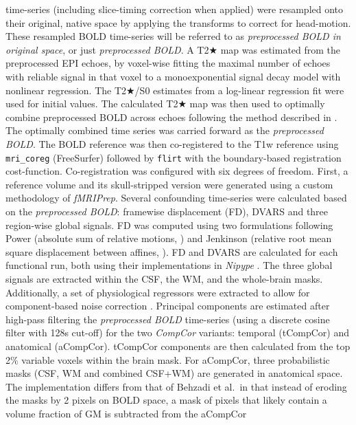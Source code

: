 \documentclass[
]{article}
\begin{document}
\begin{description}
time-series (including slice-timing correction when applied) were
resampled onto their original, native space by applying the transforms
to correct for head-motion. These resampled BOLD time-series will be
referred to as \emph{preprocessed BOLD in original space}, or just
\emph{preprocessed BOLD}. A T2★ map was estimated from the preprocessed
EPI echoes, by voxel-wise fitting the maximal number of echoes with
reliable signal in that voxel to a monoexponential signal decay model
with nonlinear regression. The T2★/S0 estimates from a log-linear
regression fit were used for initial values. The calculated T2★ map was
then used to optimally combine preprocessed BOLD across echoes following
the method described in \citep{posse_t2s}. The optimally combined time
series was carried forward as the \emph{preprocessed BOLD}. The BOLD
reference was then co-registered to the T1w reference using
\texttt{mri\_coreg} (FreeSurfer) followed by \texttt{flirt} \citep[FSL
6.0.5.1:57b01774,][]{flirt} with the boundary-based registration
\citep{bbr} cost-function. Co-registration was configured with six
degrees of freedom. First, a reference volume and its skull-stripped
version were generated using a custom methodology of \emph{fMRIPrep}.
Several confounding time-series were calculated based on the
\emph{preprocessed BOLD}: framewise displacement (FD), DVARS and three
region-wise global signals. FD was computed using two formulations
following Power (absolute sum of relative motions,
\citet{power_fd_dvars}) and Jenkinson (relative root mean square
displacement between affines, \citet{mcflirt}). FD and DVARS are
calculated for each functional run, both using their implementations in
\emph{Nipype} \citep[following the definitions by][]{power_fd_dvars}.
The three global signals are extracted within the CSF, the WM, and the
whole-brain masks. Additionally, a set of physiological regressors were
extracted to allow for component-based noise correction
\citep[\emph{CompCor},][]{compcor}. Principal components are estimated
after high-pass filtering the \emph{preprocessed BOLD} time-series
(using a discrete cosine filter with 128s cut-off) for the two
\emph{CompCor} variants: temporal (tCompCor) and anatomical (aCompCor).
tCompCor components are then calculated from the top 2\% variable voxels
within the brain mask. For aCompCor, three probabilistic masks (CSF, WM
and combined CSF+WM) are generated in anatomical space. The
implementation differs from that of Behzadi et al.~in that instead of
eroding the masks by 2 pixels on BOLD space, a mask of pixels that
likely contain a volume fraction of GM is subtracted from the aCompCor

\end{description}
\end{document}
